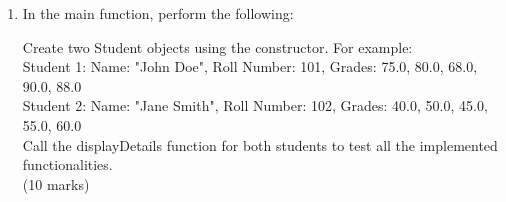 \documentclass[a4paper,12pt]{article}
\begin{document}
\begin{enumerate}
    (5 marks)\\
    Write a member function named \verb|displayDetails| in the \verb|Student| class. This function should:\\

    Display the student's name, roll number, grades, average grade, and pass/fail status in a formatted manner. Here it is below:\\

    Name: John Doe\\
    Roll Number: 101\\
    Grades: 75.0 80.0 68.0 90.0 88.0\\
    Average Grade: 80.2\\
    Status: Pass\\

    \begin{center}
    Part 4 (final part) on the next page
    \end{center}

    \newpage
    
    \item In the main function, perform the following:

    Create two Student objects using the constructor. For example:\\
    
    Student 1: Name: "John Doe", Roll Number: 101, Grades: {75.0, 80.0, 68.0, 90.0, 88.0}\\
    Student 2: Name: "Jane Smith", Roll Number: 102, Grades: {40.0, 50.0, 45.0, 55.0, 60.0}\\

    Call the displayDetails function for both students to test all the implemented functionalities.\\

    (10 marks)
    
\end{enumerate}
\vfill
\end{document}
